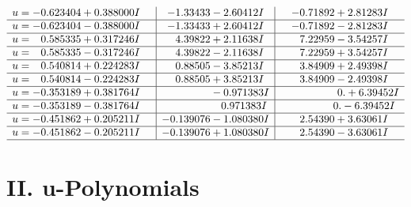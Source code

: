 \documentclass[1p]{elsarticle_modified}
\theoremstyle{definition}
\begin{document}
$$\begin{array}{c|c|c}
\begin{aligned}
u &= -0.623404 + 0.388000 I\end{aligned}
 & -1.33433 - 2.60412 I & -0.71892 + 2.81283 I \\ \hline\begin{aligned}
u &= -0.623404 - 0.388000 I\end{aligned}
 & -1.33433 + 2.60412 I & -0.71892 - 2.81283 I \\ \hline\begin{aligned}
u &= \phantom{-}0.585335 + 0.317246 I\end{aligned}
 & \phantom{-}4.39822 + 2.11638 I & \phantom{-}7.22959 - 3.54257 I \\ \hline\begin{aligned}
u &= \phantom{-}0.585335 - 0.317246 I\end{aligned}
 & \phantom{-}4.39822 - 2.11638 I & \phantom{-}7.22959 + 3.54257 I \\ \hline\begin{aligned}
u &= \phantom{-}0.540814 + 0.224283 I\end{aligned}
 & \phantom{-}0.88505 - 3.85213 I & \phantom{-}3.84909 + 2.49398 I \\ \hline\begin{aligned}
u &= \phantom{-}0.540814 - 0.224283 I\end{aligned}
 & \phantom{-}0.88505 + 3.85213 I & \phantom{-}3.84909 - 2.49398 I \\ \hline\begin{aligned}
u &= -0.353189 + 0.381764 I\end{aligned}
 & \phantom{-0.000000 } -0.971383 I & \phantom{-0.000000 -}0. + 6.39452 I \\ \hline\begin{aligned}
u &= -0.353189 - 0.381764 I\end{aligned}
 & \phantom{-0.000000 -}0.971383 I & \phantom{-0.000000 } 0. - 6.39452 I \\ \hline\begin{aligned}
u &= -0.451862 + 0.205211 I\end{aligned}
 & -0.139076 - 1.080380 I & \phantom{-}2.54390 + 3.63061 I \\ \hline\begin{aligned}
u &= -0.451862 - 0.205211 I\end{aligned}
 & -0.139076 + 1.080380 I & \phantom{-}2.54390 - 3.63061 I\\
 \hline 
 \end{array}$$\newpage
\newpage\renewcommand{\arraystretch}{1}
\centering \section*{ II. u-Polynomials}
\end{document}

